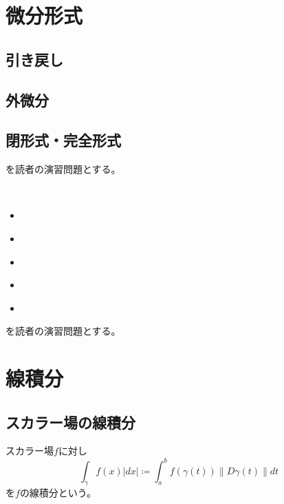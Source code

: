 \documentclass[report]{jlreq}
\begin{document}
%
\section{微分形式}

\subsection{引き戻し}

\subsection{外微分}

\subsection{閉形式・完全形式}



\begin{problem}
    \cite[問題8.1-8.9]{清水16}を読者の演習問題とする。
\end{problem}

\begin{problem}
    \,
    \begin{itemize}
        \item \cite[第IV章 問8.1 (1)-(4)]{杉浦+89}
        \item \cite[第IV章 問8.2 (1),(2)]{杉浦+89}
        \item \cite[第IV章 問8.3]{杉浦+89}
        \item \cite[第IV章 問8.4 (1)-(6)]{杉浦+89}
        \item \cite[第IV章 問8.5 (1)-(3)]{杉浦+89}
    \end{itemize}
    を読者の演習問題とする。
\end{problem}


%
\section{線積分}

\subsection{スカラー場の線積分}
\begin{definition}[スカラー場の線積分]
    スカラー場$f$に対し
    \begin{equation}
        \int_{\gamma} f(x) |dx|
            \coloneqq \int_a^b f(\gamma(t)) \| D\gamma(t) \| dt
    \end{equation}
    を$f$の線積分という。
\end{definition}
\end{document}
